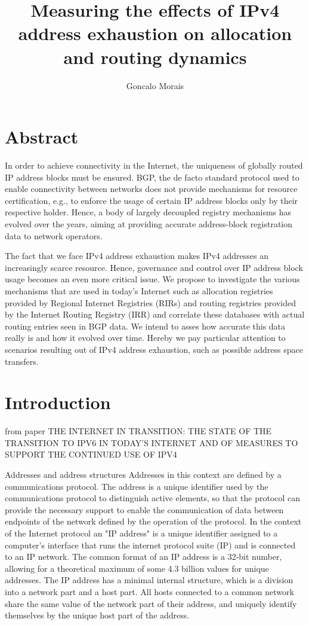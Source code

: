\documentclass[11pt]{report}
\title{\textbf{Measuring the effects of IPv4 address exhaustion on allocation and routing dynamics}}
\author{Goncalo Morais}
\date{}
\begin{document}
\maketitle
\section{Abstract}
In order to achieve connectivity in the Internet, the uniqueness of
globally routed IP address blocks must be ensured. BGP, the de facto
standard protocol used to enable connectivity between networks does not
provide mechanisms for resource certification, e.g., to enforce the
usage of certain IP address blocks only by their respective holder.
Hence, a body of largely decoupled registry mechanisms has evolved over
the years, aiming at providing accurate address-block registration data
to network operators.

The fact that we face IPv4 address exhaustion makes IPv4 addresses an
increasingly scarce resource. Hence, governance and control over IP
address block usage becomes an even more critical issue. We propose to
investigate the various mechanisms that are used in today's Internet
such as allocation registries provided by Regional Internet Registries
(RIRs) and routing registries provided by the Internet Routing Registry
(IRR) and correlate these databases with actual routing entries seen in
BGP data. We intend to asses how accurate this data really is and how it
evolved over time. Hereby we pay particular attention to scenarios
resulting out of IPv4 address exhaustion, such as possible address space
transfers.

\section{Introduction}

from paper THE INTERNET IN TRANSITION: THE STATE OF THE TRANSITION TO IPV6 IN
TODAY'S INTERNET AND OF MEASURES TO SUPPORT THE CONTINUED USE OF
IPV4

Addresses and address structures
Addresses in this context are defined by a communications protocol. The address is a unique
identifier used by the communications protocol to distinguish active elements, so that the protocol can
provide the necessary support to enable the communication of data between endpoints of the network
defined by the operation of the protocol.
In the context of the Internet protocol an "IP address" is a unique identifier assigned to a
computer's interface that runs the internet protocol suite (IP) and is connected to an IP network. The
common format of an IP address is a 32-bit number, allowing for a theoretical maximum of some
4.3 billion values for unique addresses.
The IP address has a minimal internal structure, which is a division into a network part and a host
part. All hosts connected to a common network share the same value of the network part of their address,
and uniquely identify themselves by the unique host part of the address.
\end{document}
